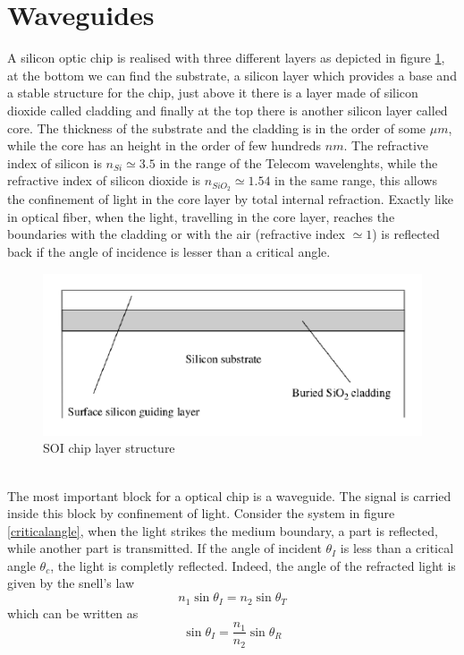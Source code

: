 \section{Waveguides}
A silicon optic chip is realised with three different layers as depicted in figure \ref{SOIstructure}, at the bottom we can find the substrate, a silicon layer which provides a base and a stable structure for the chip, just above it there is a layer made of silicon dioxide called cladding and finally at the top there is another silicon layer called core. The thickness of the substrate and the cladding is in the order of some $\mu m$, while the core has an height in the order of few hundreds $nm$. The refractive index of silicon is $n_{Si} \simeq 3.5$ in the range of the Telecom wavelenghts, while the refractive index of silicon dioxide is $n_{SiO_2}\simeq 1.54$ in the same range, this allows the confinement of light in the core layer by total internal refraction. Exactly like in optical fiber, when the light, travelling in the core layer, reaches the boundaries with the cladding or with the air (refractive index $\simeq 1$) is reflected back if the angle of incidence is lesser than a critical angle. 
\begin{figure}
\centering
\includegraphics[width = .7\textwidth]{img/SOIstructure}
\caption{SOI chip layer structure}
\label{SOIstructure}
\end{figure}
\\The most important block for a optical chip is a waveguide. The signal is carried inside this block by confinement of light. Consider the system in figure \ref{criticalangle}, when the light strikes the medium boundary, a part is reflected, while another part is transmitted. If the angle of incident $\theta_I$ is less than a critical angle $\theta_c$, the light is completly reflected. Indeed, the angle of the refracted light is given by the snell's law
\begin{equation}n_1 \sin \theta_I = n_2 \sin \theta_T\end{equation}
which can be written as
\begin{equation}\sin \theta_I = \frac{n_1}{n_2}\sin \theta_R\end{equation}
